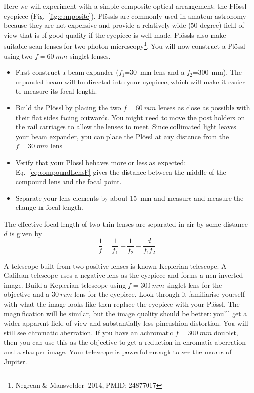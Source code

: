 \documentclass[a4paper]{report}
\begin{document}
Here we will experiment with a simple composite optical arrangement: the Pl\"{o}ssl eyepiece (Fig.~\ref{fig:composite}). 
Pl\"{o}ssls are commonly used in amateur astronomy because they are not expensive and provide a relatively wide (50 degree) field of view that is of good 
quality if the eyepiece is well made. 
Pl\"{o}ssls also make suitable scan lenses for two photon microscopy\footnote{Negrean \& Mansvelder, 2014, PMID: 24877017}.
You will now construct a Pl\"{o}ssl using two $f=60~mm$ singlet lenses.


\begin{itemize}
\item First construct a beam expander ($f_1$=30~mm lens and a $f_2$=300~mm). 
The expanded beam will be directed into your eyepiece, which will make it easier to measure its focal length.
\item Build the Pl\"ossl by placing the two $f=60~mm$ lenses as close as possible with their flat sides facing outwards. 
You might need to move the post holders on the rail carriages to allow the lenses to meet.
Since collimated light leaves your beam expander, you can place the Pl\"ossl at any distance from the $f=30~mm$ lens. 
\item Verify that your Pl\"{o}ssl behaves more or less as expected: 
Eq.~\ref{eq:compoundLensF} gives the distance between the middle of the compound lens and the focal point. 
\item Separate your lens elements by about 15~mm and measure and measure the change in focal length.
\end{itemize}

The effective focal length of two thin lenses are separated in air by some distance $d$ is given by
\begin{equation}
\frac{1}{f} = \frac{1}{f_1} + \frac{1}{f_2} - \frac{d}{f_1f_2}
\label{eq:compoundLensF}
\end{equation}

A telescope built from two positive lenses is known Keplerian telescope. 
A Galilean telescope uses a negative lens as the eyepiece and forms a non-inverted image.
Build a Keplerian telescope using $f=300~mm$ singlet lens for the objective and a $30~mm$ lens for the eyepiece. 
Look through it familiarise yourself with what the image looks like then replace the eyepiece with your Pl\"{o}ssl. 
The magnification will be similar, but the image quality should be better: you'll get a wider apparent field of view and substantially less pincushion distortion. 
You will still see chromatic aberration. 
If you have an achromatic $f=300~mm$ doublet, then you can use this as the objective to get a reduction in chromatic aberration and a sharper image. 
Your telescope is powerful enough to see the moons of Jupiter. 
\end{document}

